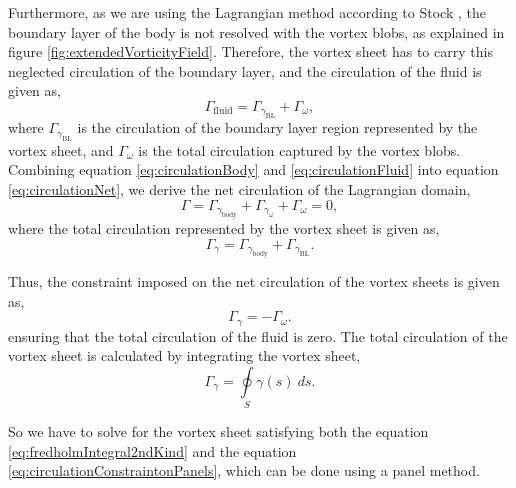 Furthermore, as we are using the Lagrangian method according to Stock \cite{Stock2010a}, the boundary layer of the body is not resolved with the vortex blobs, as explained in figure \ref{fig:extendedVorticityField}. Therefore, the vortex sheet has to carry this neglected circulation of the boundary layer, and the circulation of the fluid is given as,
	\begin{equation}
	\Gamma_{\mathrm{fluid}} = \Gamma_{\gamma_{\mathrm{BL}}} + \Gamma_{\omega},
	\label{eq:circulationFluid}
	\end{equation}
where $\Gamma_{\gamma_{\mathrm{BL}}}$ is the circulation of the boundary layer region represented by the vortex sheet, and $\Gamma_{\omega}$ is the total circulation captured by the vortex blobs. Combining equation \ref{eq:circulationBody} and \ref{eq:circulationFluid} into equation \ref{eq:circulationNet}, we derive the net circulation of the Lagrangian domain,
	\begin{equation}
	\Gamma = \Gamma_{\gamma_{\mathrm{body}}} + \Gamma_{\gamma_{\omega}} + \Gamma_{\omega} = 0,
	\end{equation}
where the total circulation represented by the vortex sheet is given as,
	\begin{equation}
	\Gamma_{\gamma} = \Gamma_{\gamma_{\mathrm{body}}} + \Gamma_{\gamma_{\mathrm{BL}}}.
	\end{equation}

Thus, the constraint imposed on the net circulation of the vortex sheets is given as,
	\begin{equation}
	\Gamma_{\gamma} = - \Gamma_{\omega}.
	\end{equation}	
ensuring that the total circulation of the fluid is zero. The total circulation of the vortex sheet is calculated by integrating the vortex sheet,
	\begin{equation}
	\Gamma_{\gamma} = \oint\limits_S\gamma\left(s\right)\ d s.
	\label{eq:circulationConstraintonPanels}
	\end{equation}	

So we have to solve for the vortex sheet satisfying both the equation \ref{eq:fredholmIntegral2ndKind} and the equation \ref{eq:circulationConstraintonPanels}, which can be done using a panel method.


